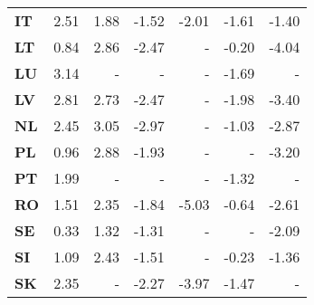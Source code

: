 \begin{tabular}{lrr|rrrr}
\textbf{IT     } &              2.51 & 1.88 &              -1.52 &  -2.01 & -1.61 & -1.40 \\
\textbf{LT     } &              0.84 & 2.86 &              -2.47 &      - & -0.20 & -4.04 \\
\textbf{LU     } &              3.14 &    - &                  - &      - & -1.69 &     - \\
\textbf{LV     } &              2.81 & 2.73 &              -2.47 &      - & -1.98 & -3.40 \\
\textbf{NL     } &              2.45 & 3.05 &              -2.97 &      - & -1.03 & -2.87 \\
\textbf{PL     } &              0.96 & 2.88 &              -1.93 &      - &     - & -3.20 \\
\textbf{PT     } &              1.99 &    - &                  - &      - & -1.32 &     - \\
\textbf{RO     } &              1.51 & 2.35 &              -1.84 &  -5.03 & -0.64 & -2.61 \\
\textbf{SE     } &              0.33 & 1.32 &              -1.31 &      - &     - & -2.09 \\
\textbf{SI     } &              1.09 & 2.43 &              -1.51 &      - & -0.23 & -1.36 \\
\textbf{SK     } &              2.35 &    - &              -2.27 &  -3.97 & -1.47 &     - \\
\bottomrule
\end{tabular}
